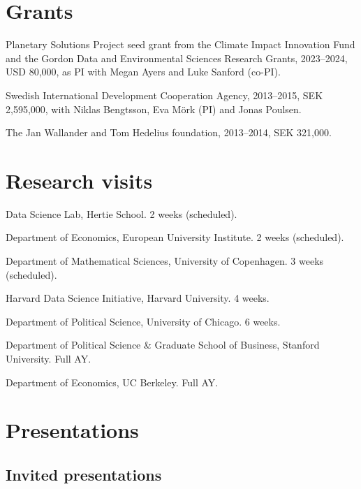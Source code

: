 \documentclass[10pt,letterpaper]{article}
\newenvironment{datelist}{
	\begin{list}{}{
		\setlength{\parskip}{0pt}
		\setlength{\itemsep}{4pt}
		\setlength{\parsep}{0.3em}
		\setlength{\leftmargin}{5.85em}
		\setlength{\labelwidth}{5.85em}
		\setlength{\labelsep}{1.5em}
		}
	}{
\end{list}
}
\newcommand{\dateitem}[2][]{\item[{#1}] {#2}}
\newenvironment{infolist}{
	\begin{list}{}{
		\setlength{\parskip}{0pt}
		\setlength{\itemsep}{4pt}
		\setlength{\parsep}{0.3em}
		\setlength{\leftmargin}{0em}
		\setlength{\labelwidth}{0em}
		}
	}{
\end{list}
}
\newcommand{\infoitem}[1]{\item {#1}}
\begin{document}
	\section*{Grants}

	\begin{infolist}
		\infoitem{Planetary Solutions Project seed grant from the Climate Impact Innovation Fund and the Gordon Data and Environmental Sciences Research Grants, 2023--2024, USD 80,000, as PI with Megan Ayers and Luke Sanford (co-PI).}
		\infoitem{Swedish International Development Cooperation Agency, 2013--2015, SEK 2,595,000, with Niklas Bengtsson, Eva Mörk (PI) and Jonas Poulsen.}
		\infoitem{The Jan Wallander and Tom Hedelius foundation, 2013--2014, SEK 321,000.}
	\end{infolist}


	\section*{Research visits}

	\begin{datelist}
		\dateitem[2024]{Data Science Lab, Hertie School. 2 weeks (scheduled).}
		\dateitem[2024]{Department of Economics, European University Institute. 2 weeks (scheduled).}
		\dateitem[2024]{Department of Mathematical Sciences, University of Copenhagen. 3 weeks (scheduled).}
		\dateitem[2024]{Harvard Data Science Initiative, Harvard University. 4 weeks.}
		\dateitem[2023]{Department of Political Science, University of Chicago. 6 weeks.}
		\dateitem[2019--2020]{Department of Political Science \& Graduate School of Business, Stanford University. Full AY.}
		\dateitem[2013--2014]{Department of Economics, UC Berkeley. Full AY.}
	\end{datelist}


	\section*{Presentations}

	\subsection*{Invited presentations}
\end{document}
